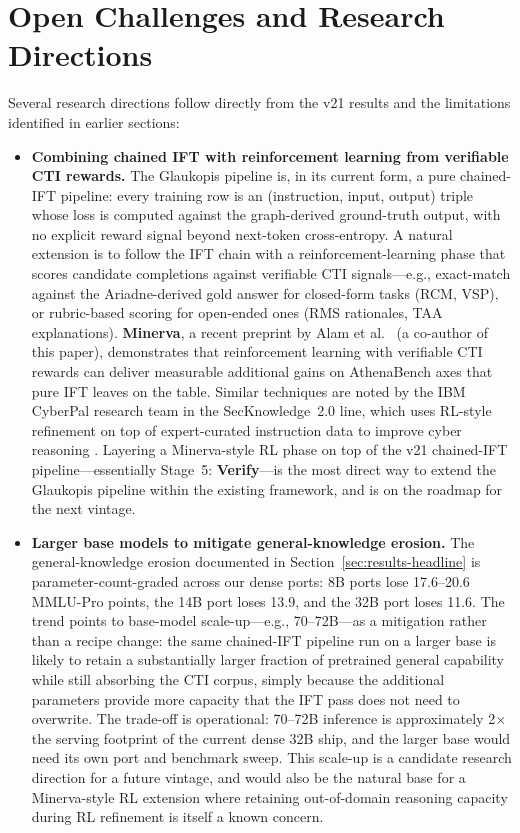 \documentclass[conference]{IEEEtran}
\begin{document}
\section{Open Challenges and Research Directions}
\label{sec:open-challenges}

Several research directions follow directly from the v21 results and the limitations identified in earlier sections:

\begin{itemize}
  \item \textbf{Combining chained IFT with reinforcement learning from verifiable CTI rewards.} The Glaukopis pipeline is, in its current form, a pure chained-IFT pipeline: every training row is an (instruction, input, output) triple whose loss is computed against the graph-derived ground-truth output, with no explicit reward signal beyond next-token cross-entropy. A natural extension is to follow the IFT chain with a reinforcement-learning phase that scores candidate completions against verifiable CTI signals---e.g., exact-match against the Ariadne-derived gold answer for closed-form tasks (RCM, VSP), or rubric-based scoring for open-ended ones (RMS rationales, TAA explanations). \textbf{Minerva}, a recent preprint by Alam et al.\ \cite{alam2026minerva} (a co-author of this paper), demonstrates that reinforcement learning with verifiable CTI rewards can deliver measurable additional gains on AthenaBench axes that pure IFT leaves on the table. Similar techniques are noted by the IBM CyberPal research team in the SecKnowledge~2.0 line, which uses RL-style refinement on top of expert-curated instruction data to improve cyber reasoning \cite{levi2025toward}. Layering a Minerva-style RL phase on top of the v21 chained-IFT pipeline---essentially Stage~5: \textbf{Verify}---is the most direct way to extend the Glaukopis pipeline within the existing framework, and is on the roadmap for the next vintage.
  \item \textbf{Larger base models to mitigate general-knowledge erosion.} The general-knowledge erosion documented in Section~\ref{sec:results-headline} is parameter-count-graded across our dense ports: 8B ports lose 17.6--20.6 MMLU-Pro points, the 14B port loses 13.9, and the 32B port loses 11.6. The trend points to base-model scale-up---e.g., 70--72B---as a mitigation rather than a recipe change: the same chained-IFT pipeline run on a larger base is likely to retain a substantially larger fraction of pretrained general capability while still absorbing the CTI corpus, simply because the additional parameters provide more capacity that the IFT pass does not need to overwrite. The trade-off is operational: 70--72B inference is approximately 2$\times$ the serving footprint of the current dense 32B ship, and the larger base would need its own port and benchmark sweep. This scale-up is a candidate research direction for a future vintage, and would also be the natural base for a Minerva-style RL extension where retaining out-of-domain reasoning capacity during RL refinement is itself a known concern.

\end{itemize}
\end{document}
